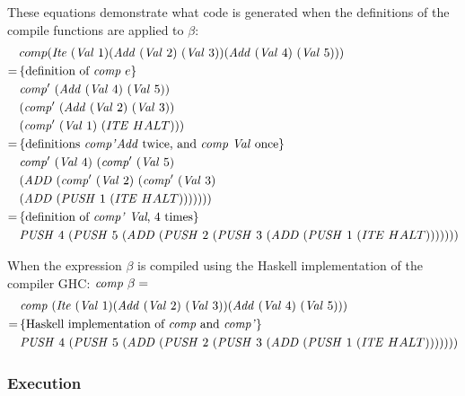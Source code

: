 \documentclass {article}
\begin{document}
These equations demonstrate what code is generated
when the definitions of the compile functions are applied to $\beta$:
\begin{align*}
	&comp (\Ite	(\Val 1) (\Add (\Val 2)\ (\Val 3)) (\Add (\Val 4)\ (\Val 5))) \\
	=\, & \{ \mbox{definition of \comp\ $e$} \}\ \\ 
	&\Compp  (\Add (\Val 4)\ (\Val 5))\\
		&(\Compp  (\Add (\Val 2)\ (\Val 3))\\
			&(\Compp  (\Val 1)\ (\ITE  HALT))) \\
	=\, & \{ \mbox{definitions \compp \add\ twice, 
					and \comp\ \val\ once} \} \\
	&\Compp  (\Val 4)\ 
		(\Compp  (\Val 5)\ \\
				&(\ADD  (\Compp  (\Val 2)\ 
						(\Compp  (\Val 3)\ \\
							&(\ADD  (\PUSH 1\ 
								(\ITE HALT))))))) \\
	=\, & \{ \mbox{definition of \compp\ \val, 4 times} \} \\
	&\PUSH 4\ (\PUSH 5\ 
		(\ADD  (\PUSH 2\ (\PUSH 3\ 
			(\ADD  (\PUSH 1\ (\ITE HALT)))))))
\end{align*}

When the expression $\beta$ is compiled
using the Haskell implementation of the compiler
GHC: \( \mathit{comp\ } \beta =\)
\begin{align*}
&\Comp (\Ite
			(\Val 1)
			(\Add (\Val 2)\ (\Val 3))
			(\Add (\Val 4)\ (\Val 5))) \\
=\, & \{ \mbox{Haskell implementation of \comp\ and \compp} \} \\
&\PUSH 4\ (\PUSH 5\
	(\ADD  (\PUSH 2\ (\PUSH 3\ 
		(\ADD  (\PUSH 1\ (\ITE HALT)))))))
\end{align*}
	
\subsubsection{Execution}
\end{document}
